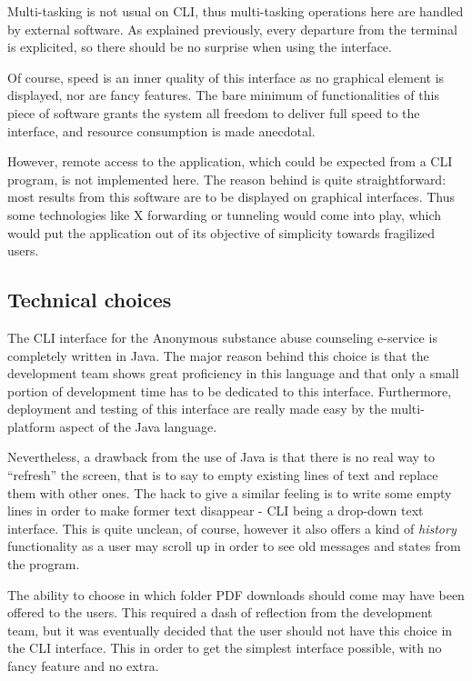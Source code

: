 \documentclass[a4paper,12pt, twocolumn]{article}
\begin{document}
Multi-tasking is not usual on CLI, thus multi-tasking operations here are handled by external software. As explained previously, every departure from the terminal is explicited, so there should be no surprise when using the interface.

Of course, speed is an inner quality of this interface as no graphical element is displayed, nor are fancy features. The bare minimum of functionalities of this piece of software grants the system all freedom to deliver full speed to the interface, and resource consumption is made anecdotal.

However, remote access to the application, which could be expected from a CLI program, is not implemented here. The reason behind is quite straightforward: most results from this software are to be displayed on graphical interfaces. Thus some technologies like X forwarding or tunneling would come into play, which would put the application out of its objective of simplicity towards fragilized users.

\subsection*{Technical choices}

The CLI interface for the Anonymous substance abuse counseling e-service is completely written in Java. The major reason behind this choice is that the development team shows great proficiency in this language and that only a small portion of development time has to be dedicated to this interface. Furthermore, deployment and testing of this interface are really made easy by the multi-platform aspect of the Java language.

Nevertheless, a drawback from the use of Java is that there is no real way to ``refresh'' the screen, that is to say to empty existing lines of text and replace them with other ones. The hack to give a similar feeling is to write some empty lines in order to make former text disappear - CLI being a drop-down text interface. This is quite unclean, of course, however it also offers a kind of \emph{history} functionality as a user may scroll up in order to see old messages and states from the program.

The ability to choose in which folder PDF downloads should come may have been offered to the users. This required a dash of reflection from the development team, but it was eventually decided that the user should not have this choice in the CLI interface. This in order to get the simplest interface possible, with no fancy feature and no extra.
\end{document}
